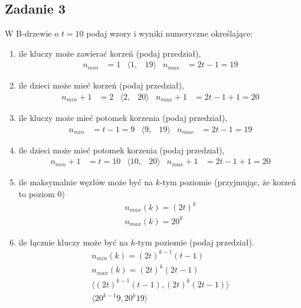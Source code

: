\documentclass{article}
\begin{document}
\subsection*{Zadanie 3}
W B-drzewie o $t=10$ podaj wzory i wyniki numeryczne określające:
\begin{enumerate}[label=(\alph*)]
    \item ile kluczy może zawierać korzeń (podaj przedział),
          \begin{align*}
              n_{min} & = 1 & \langle 1, & 19 \rangle & n_{max} & = 2t-1 = 19
          \end{align*}
    \item ile dzieci może mieć korzeń (podaj przedział),
          \begin{align*}
              n_{min} + 1 & = 2 & \langle 2, & 20 \rangle & n_{max}+1 & = 2t-1+1 = 20
          \end{align*}
    \item ile kluczy może mieć potomek korzenia (podaj przedział),
          \begin{align*}
              n_{min} & = t-1 = 9 & \langle 9, & 19 \rangle & n_{max} & = 2t-1 = 19
          \end{align*}
    \item ile dzieci może mieć potomek korzenia (podaj przedział),
          \begin{align*}
              n_{min} + 1 & = t = 10 & \langle 10, & 20 \rangle & n_{max}+1 & = 2t-1+1 = 20
          \end{align*}
    \item ile maksymalnie węzłów może być na $k$-tym poziomie (przyjmując, że korzeń to poziom $0$)
          \begin{gather*}
              n_{max}(k) = (2t)^k \\
              n_{max}(k) = 20^k
          \end{gather*}
    \item ile łącznie kluczy może być na $k$-tym poziomie (podaj przedział).
          \begin{gather*}
              n_{min}(k) = (2t)^{k-1}(t-1) \\
              n_{max}(k) = (2t)^k(2t-1) \\
              \langle (2t)^{k-1}(t-1), (2t)^k(2t-1) \rangle \\
              \langle 20^{k-1}9, 20^k19 \rangle
          \end{gather*}
\end{enumerate}
\end{document}
